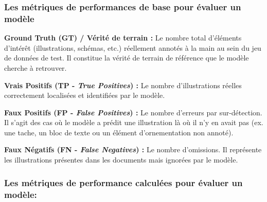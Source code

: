 \subsubsection{Les métriques de performances de base pour évaluer un modèle}

\begin{description}
    
        \item \textbf{Ground Truth (GT) / Vérité de terrain : }Le nombre total d'éléments d'intérêt (illustrations, schémas, etc.) réellement annotés à la main au sein du jeu de données de test. Il constitue la vérité de terrain de référence que le modèle cherche à retrouver.

        \item \textbf{Vrais Positifs (TP - \textit{True Positives}) :} Le nombre d'illustrations réelles correctement localisées et identifiées par le modèle.

        \item \textbf{Faux Positifs (FP - \textit{False Positives}) :} Le nombre d'erreurs par sur-détection. Il s'agit des cas où le modèle a prédit une illustration là où il n'y en avait pas (ex. une tache, un bloc de texte ou un élément d'ornementation non annoté).

        \item \textbf{Faux Négatifs (FN - \textit{False Negatives}) :} Le nombre d'omissions. Il représente les illustrations présentes dans les documents mais ignorées par le modèle.
    
\end{description}
    
\subsubsection{Les métriques de performance calculées pour évaluer un modèle:}

